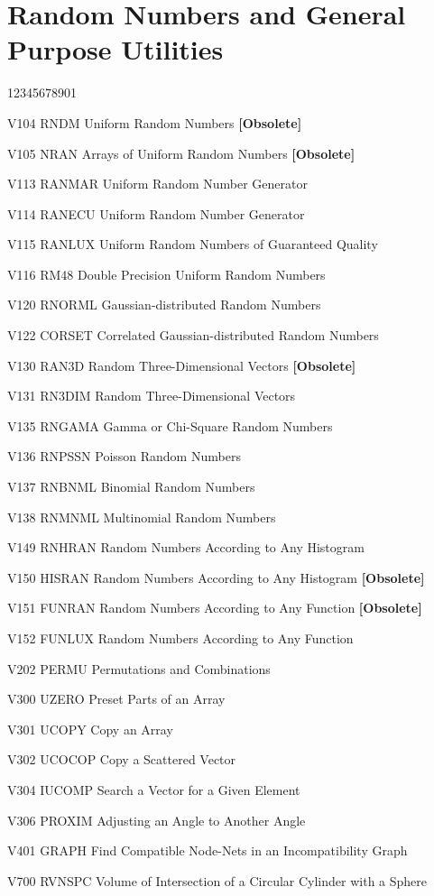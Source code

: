 \section*{Random Numbers and General Purpose Utilities}
\begin{DLtt}{12345678901}
\item[V104 RNDM] Uniform Random Numbers {\bf [Obsolete]}
\item[V105 NRAN] Arrays of Uniform Random Numbers {\bf [Obsolete]}
\item[V113 RANMAR] Uniform Random Number Generator
\item[V114 RANECU] Uniform Random Number Generator
\item[V115 RANLUX] Uniform Random Numbers of Guaranteed Quality
\item[V116 RM48]   Double Precision Uniform Random Numbers
\item[V120 RNORML] Gaussian-distributed Random Numbers
\item[V122 CORSET] Correlated Gaussian-distributed Random Numbers
\item[V130 RAN3D]  Random Three-Dimensional Vectors {\bf [Obsolete]}
\item[V131 RN3DIM] Random Three-Dimensional Vectors
\item[V135 RNGAMA] Gamma or Chi-Square Random Numbers
\item[V136 RNPSSN] Poisson Random Numbers
\item[V137 RNBNML] Binomial Random Numbers
\item[V138 RNMNML] Multinomial Random Numbers
\item[V149 RNHRAN] Random Numbers According to Any Histogram
\item[V150 HISRAN] Random Numbers According to Any Histogram
{\bf [Obsolete]}
\item[V151 FUNRAN] Random Numbers According to Any Function
{\bf [Obsolete]}
\item[V152 FUNLUX] Random Numbers According to Any Function
\item[V202 PERMU] Permutations and Combinations
\item[V300 UZERO] Preset Parts of an Array
\item[V301 UCOPY] Copy an Array
\item[V302 UCOCOP] Copy a Scattered Vector
\item[V304 IUCOMP] Search a Vector for a Given Element
\item[V306 PROXIM] Adjusting an Angle to Another Angle
\item[V401 GRAPH] Find Compatible Node-Nets in an Incompatibility Graph
\item[V700 RVNSPC] Volume of Intersection of a Circular Cylinder
with a Sphere
\end{DLtt}
